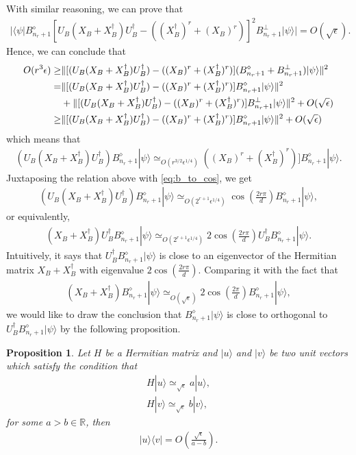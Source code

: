\documentclass[11pt,letterpaper]{article}
\newcommand{\ket}[1]{|#1\rangle}
\newcommand{\bra}[1]{\langle#1|}
\newcommand{\ketbra}[2]{|#1\rangle\langle#2|}
\newcommand{\ct}{^{\dagger}}
\DeclarePairedDelimiter{\norm}{\lVert}{\rVert}
\newcommand{\R}{\mathbb{R}}
\newcommand{\1}{\mathbb{1}}
\newcommand{\appd}[1]{\simeq_{#1}}
\newtheorem{proposition}[theorem]{Proposition}
\theoremstyle{definition}
\begin{document}
With similar reasoning, we can prove that
\begin{align}
	|\bra{\psi} B_{n_r+1}^\diamond [U_B(X_B+X_B\ct)U_B\ct - ((X_B\ct)^r+(X_B)^r)]^2 B_{n_r+1}^\perp \ket{\psi}| = O(\sqrt{\epsilon}).
\end{align}	
Hence, we can conclude that 
\begin{align}
	O(r^3\epsilon) \geq &\norm{[(U_B(X_B+X_B\ct)U_B\ct) - ((X_B)^r + (X_B\ct)^r)](B_{n_r+1}^\diamond + B_{n_r+1}^\perp)\ket{\psi}}^2\\
	= &\norm{[(U_B(X_B+X_B\ct)U_B\ct) - ((X_B)^r + (X_B\ct)^r)]B_{n_r+1}^\diamond\ket{\psi}}^2\\
	&+ \norm{[(U_B(X_B+X_B\ct)U_B\ct) - ((X_B)^r + (X_B\ct)^r)]B_{n_r+1}^\perp\ket{\psi}}^2 +O(\sqrt{\epsilon})\\
	\geq &\norm{[(U_B(X_B+X_B\ct)U_B\ct) - ((X_B)^r + (X_B\ct)^r)]B_{n_r+1}^\diamond\ket{\psi}}^2 + O(\sqrt{\epsilon})
\end{align}
which means that 
\begin{align}
(U_B(X_B+X_B\ct)U_B\ct)B_{n_r+1}^\diamond \ket{\psi} \appd{O(r^{3/2} \epsilon^{1/4})}((X_B)^r + (X_B\ct)^r)]B_{n_r+1}^\diamond\ket{\psi}.
\end{align}
Juxtaposing the relation above with \cref{eq:b_to_cos}, we get
\begin{align}
	(U_B(X_B+X_B\ct)U_B\ct) B_{n_r+1}^\diamond \ket{\psi} 
	\appd{O(2^{r+1}\epsilon^{1/4})} \cos(\frac{2r\pi}{d}) B_{n_r+1}^\diamond\ket{\psi},
\end{align}
or equivalently,
\begin{align}
	(X_B + X_B\ct) U_B\ct B_{n_r+1}^\diamond \ket{\psi} \appd{O(2^{r+1}\epsilon^{1/4})}  
	2\cos(\frac{2r\pi}{d}) U_B\ct B_{n_r+1}^\diamond \ket{\psi}.
\end{align}
Intuitively, it says that $U_B\ct B_{n_r+1}^\diamond \ket{\psi}$ is close to an eigenvector of 
the Hermitian matrix $X_B +X_B\ct$ with eigenvalue $2\cos(\frac{2r\pi}{d})$.
Comparing it with the fact that
\begin{align}
(X_B + X_B\ct) B_{n_r+1}^\diamond \ket{\psi} \appd{O(\sqrt{\epsilon})}  
	2\cos(\frac{2\pi}{d}) B_{n_r+1}^\diamond \ket{\psi},
\end{align}
we would like to draw the conclusion that $B_{n_r+1}^\diamond \ket{\psi}$ is 
close to orthogonal to $U_B\ct B_{n_r+1}^\diamond \ket{\psi}$
by the following proposition.
\begin{proposition}
\label{prop:orthog}
	Let $H$ be a Hermitian matrix and $\ket{u}$ and $\ket{v}$ be two unit vectors
	which satisfy the condition that 
	\begin{align}
		H\ket{u} \appd{\sqrt{\epsilon}} a \ket{u}, \\
		H\ket{v} \appd{\sqrt{\epsilon}} b \ket{v}, 
	\end{align}
	for some $a > b \in \R$, then
	\begin{align}
		\ketbra{u}{v} = O(\frac{\sqrt{\epsilon}}{a-b}).
	\end{align}
\end{proposition}
\end{document}
